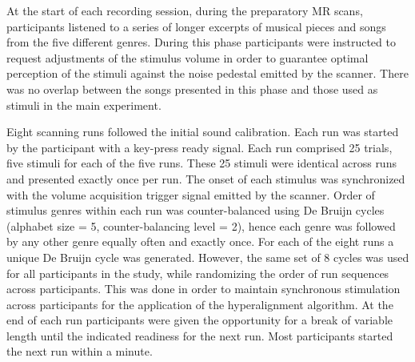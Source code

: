 At the start of each recording session, during the preparatory MR scans,
participants listened to a series of longer excerpts of musical pieces and
songs from the five different genres. During this phase participants were
instructed to request adjustments of the stimulus volume in order to guarantee
optimal perception of the stimuli against the noise pedestal emitted by the
scanner. There was no overlap between the songs presented in this phase and those
used as stimuli in the main experiment.

Eight scanning runs followed the initial sound calibration. Each run was
started by the participant with a key-press ready signal. Each run comprised 25
trials, five stimuli for each of the five runs. These 25 stimuli were identical
across runs and presented exactly once per run. The onset of each stimulus was
synchronized with the volume acquisition trigger signal emitted by the scanner.
Order of stimulus genres within each run was counter-balanced using De Bruijn
cycles \cite{AMM+2011} (alphabet size = 5, counter-balancing level = 2),
hence each genre was followed by any other genre equally often and exactly
once.  For each of the eight runs a unique De Bruijn cycle was generated.
However, the same set of 8 cycles was used for all participants in the study,
while randomizing the order of run sequences across participants. This was done
in order to maintain synchronous stimulation across participants for the
application of the hyperalignment algorithm. At the end of each run
participants were given the opportunity for a break of variable length until
the indicated readiness for the next run. Most participants started the next
run within a minute.

